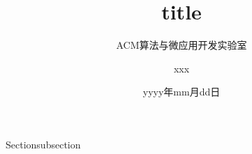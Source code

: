 \documentclass[10pt,aspectratio=169]{beamer}
\title{title}
\author{ACM算法与微应用开发实验室 \and xxx}
\date{yyyy年mm月dd日}
\begin{document}
\maketitle

\begin{frame}{Section}{subsection}

\end{frame}
\end{document}
